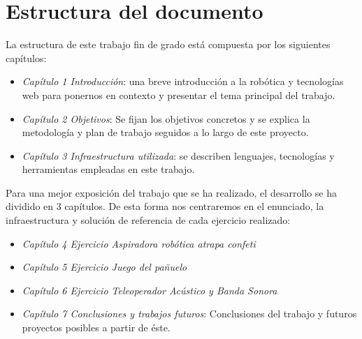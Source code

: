 \newpage
\section{Estructura del documento}

La estructura de este trabajo fin de grado está compuesta por los siguientes capítulos:

\begin{itemize}
    \item \textit{Capítulo 1 Introducción}: una breve introducción a la robótica y tecnologías web para ponernos en contexto y presentar el tema principal del trabajo.
    \item \textit{Capítulo 2 Objetivos}: Se fijan los objetivos concretos y se explica la metodología y plan de trabajo seguidos a lo largo de este proyecto.
    \item \textit{Capítulo 3 Infraestructura utilizada}: se describen lenguajes, tecnologías y herramientas empleadas en este trabajo.
\end{itemize}

Para una mejor exposición del trabajo que se ha realizado, el desarrollo se ha dividido en 3 capítulos. De esta forma nos centraremos en el enunciado, la infraestructura y solución de referencia de cada ejercicio realizado:
    
\begin{itemize}
    \item \textit{Capítulo 4 Ejercicio Aspiradora robótica atrapa confeti}
 
    \item \textit{Capítulo 5 Ejercicio Juego del pañuelo}
    
    \item \textit{Capítulo 6 Ejercicio Teleoperador Acústico y Banda Sonora}
    
    \item \textit{Capítulo 7 Conclusiones y trabajos futuros}: Conclusiones del trabajo y futuros proyectos posibles a partir de éste.
  \end{itemize}
